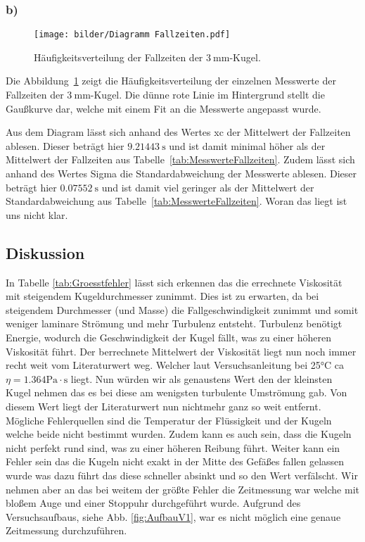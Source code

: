             \subsubsection{b)}

            \begin{figure}[H]
                \centering
                \texttt{[image: bilder/Diagramm Fallzeiten.pdf]}
                \caption{Häufigkeitsverteilung der Fallzeiten der $3\ \mathrm{mm}$-Kugel.}
                \label{fig:graph_02}
            \end{figure}

            Die Abbildung~\ref{fig:graph_02} zeigt die Häufigkeitsverteilung der einzelnen Messwerte der Fallzeiten der $3\ \mathrm{mm}$-Kugel. Die dünne rote Linie im Hintergrund stellt die Gaußkurve dar, welche mit einem Fit an die Messwerte angepasst wurde.

            Aus dem Diagram lässt sich anhand des Wertes xc der Mittelwert der Fallzeiten ablesen. Dieser beträgt hier $9.21443\ \mathrm{s}$ und ist damit minimal höher als der Mittelwert der Fallzeiten aus Tabelle~\ref{tab:MesswerteFallzeiten}. Zudem lässt sich anhand des Wertes Sigma die Standardabweichung der Messwerte ablesen. Dieser beträgt hier $0.07552\ \mathrm{s}$ und ist damit viel geringer als der Mittelwert der Standardabweichung aus Tabelle~\ref{tab:MesswerteFallzeiten}. Woran das liegt ist uns nicht klar.

        \subsection{Diskussion}

            In Tabelle \ref{tab:Groesstfehler} lässt sich erkennen das die errechnete Viskosität mit steigendem Kugeldurchmesser zunimmt. Dies ist zu erwarten, da bei steigendem Durchmesser (und Masse) die Fallgeschwindigkeit zunimmt und somit weniger laminare Strömung und mehr Turbulenz entsteht. Turbulenz benötigt Energie, wodurch die Geschwindigkeit der Kugel fällt, was zu einer höheren Viskosität führt. Der berrechnete Mittelwert der Viskosität liegt nun noch immer recht weit vom Literaturwert weg. Welcher laut Versuchsanleitung bei 25°C ca $\eta = 1.364 \mathrm{Pa \cdot s}$ liegt. Nun würden wir als genaustens Wert den der kleinsten Kugel nehmen das es bei diese am wenigsten turbulente Umströmung gab. Von diesem Wert liegt der Literaturwert nun nichtmehr ganz so weit entfernt. Mögliche Fehlerquellen sind die Temperatur der Flüssigkeit und der Kugeln welche beide nicht bestimmt wurden. Zudem kann es auch sein, dass die Kugeln nicht perfekt rund sind, was zu einer höheren Reibung führt. Weiter kann ein Fehler sein das die Kugeln nicht exakt in der Mitte des Gefäßes fallen gelassen wurde was dazu führt das diese schneller absinkt und so den Wert verfälscht. 
            Wir nehmen aber an das bei weitem der größte Fehler die Zeitmessung war welche mit bloßem Auge und einer Stoppuhr durchgeführt wurde. Aufgrund des Versuchsaufbaus, siehe Abb. \ref{fig:AufbauV1}, war es nicht möglich eine genaue Zeitmessung durchzuführen.


